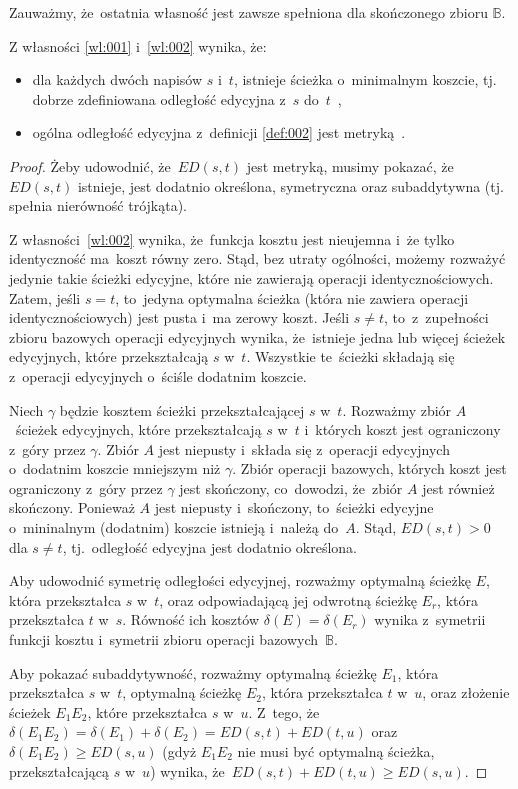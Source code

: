 \documentclass{praca1}
\begin{document}
Zauważmy, że~ostatnia własność jest zawsze spełniona dla skończonego zbioru $\mathbb{B}$.

\begin{theorem}
Z własności \ref{wl:001} i~\ref{wl:002} wynika, że:
\begin{itemize}
\item dla każdych dwóch napisów $s$ i~$t$, istnieje ścieżka o~minimalnym koszcie, tj. dobrze zdefiniowana odległość edycyjna z~$s$ do~$t$~\cite{Boytsov2011:indexingmethods},
\item ogólna odległość edycyjna z~definicji \ref{def:002} jest metryką~\cite{Wagner1974:stringtostring}.
\end{itemize}
\end{theorem}

\begin{proof}
Żeby udowodnić, że~$ED(s,t)$ jest metryką, musimy pokazać, że~$ED(s,t)$ istnieje, 	jest dodatnio określona, symetryczna oraz subaddytywna (tj. spełnia nierówność trójkąta).

Z własności~\ref{wl:002} wynika, że~funkcja kosztu jest nieujemna i~że tylko identyczność ma~koszt równy zero. Stąd, bez utraty ogólności, możemy rozważyć jedynie takie ścieżki edycyjne, które nie zawierają operacji identycznościowych. Zatem, jeśli $s=t$, to~jedyna optymalna ścieżka (która nie zawiera operacji identycznościowych) jest pusta i~ma zerowy koszt. Jeśli $s\neq t$, to~z~zupełności zbioru bazowych operacji edycyjnych wynika, że~istnieje jedna lub więcej ścieżek edycyjnych, które przekształcają $s$ w~$t$. Wszystkie te~ścieżki składają się z~operacji edycyjnych o~ściśle dodatnim koszcie.

Niech $\gamma$ będzie kosztem ścieżki przekształcającej $s$ w~$t$. Rozważmy zbiór $A$~ścieżek edycyjnych, które przekształcają $s$ w~$t$ i~których koszt jest ograniczony z~góry przez $\gamma$. Zbiór $A$ jest niepusty i~składa się z~operacji edycyjnych o~dodatnim koszcie mniejszym niż $\gamma$. Zbiór operacji bazowych, których koszt jest ograniczony z~góry przez $\gamma$ jest skończony, co~dowodzi, że~zbiór $A$ jest również skończony. Ponieważ $A$ jest niepusty i~skończony, to~ścieżki edycyjne o~mininalnym (dodatnim) koszcie istnieją i~należą do~$A$. Stąd, $ED(s,t) > 0$ dla $s\neq t$, tj.~odległość edycyjna jest dodatnio określona.

Aby udowodnić symetrię odległości edycyjnej, rozważmy optymalną ścieżkę $E$, która przekształca $s$ w~$t$, oraz odpowiadającą jej odwrotną ścieżkę $E_r$, która przekształca $t$ w~$s$. Równość ich kosztów $\delta(E) = \delta(E_r)$ wynika z~symetrii funkcji kosztu i~symetrii zbioru operacji bazowych~$\mathbb{B}$. 

Aby pokazać subaddytywność, rozważmy optymalną ścieżkę $E_1$, która przekształca $s$ w~$t$, optymalną ścieżkę $E_2$, która przekształca $t$ w~$u$, oraz złożenie ścieżek $E_1E_2$, które przekształca $s$ w~$u$. Z~tego, że~$\delta(E_1E_2) = \delta(E_1) + \delta(E_2) = ED(s,t)+ED(t,u)$ oraz $\delta(E_1E_2) \geq ED(s,u)$ (gdyż $E_1 E_2$ nie musi być optymalną ścieżka, przekształcającą $s$ w~$u$) wynika, że~$ED(s,t)+ED(t,u) \geq ED(s,u)$.
\end{proof}
\end{document}
